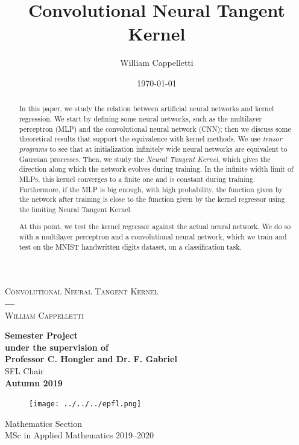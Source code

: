 \documentclass[11pt,notitlepage]{article}
\title{Convolutional Neural Tangent Kernel}
\author{William Cappelletti}
\date{\today}
\numberwithin{equation}{section}
\theoremstyle{remark}
\theoremstyle{definition}
\begin{document}
	\begin{titlepage}
		\centering
		\vspace*{0.cm}
		{\Huge \textsc{Convolutional Neural Tangent Kernel\\}}
		\vspace*{0.3cm}
		\textbf{---}\\
		\vspace*{0.3cm}
		{\Large \textsc{William Cappelletti\\}}
		\vspace*{0.7cm}
		
		\begin{abstract}
			In this paper, we study the relation between artificial neural networks and kernel regression.
			We start by defining some neural networks, such as the multilayer perceptron (MLP) and the convolutional neural network (CNN); then we discuss some theoretical results that support the equivalence with kernel methods.			
			We use \emph{tensor programs} to see that at initialization infinitely wide neural networks are equivalent to Gaussian processes.
			Then, we study the \emph{Neural Tangent Kernel}, which gives the direction along which the network evolves during training.
			In the infinite width limit of MLPs, this kernel converges to a finite one and is constant during training.
			Furthermore, if the MLP is big enough, with high probability, the function given by the network after training is close to the function given by the kernel regressor using the limiting Neural Tangent Kernel.
			
			At this point, we test the kernel regressor against the actual neural network.
			We do so with a multilayer perceptron and a convolutional neural network, which we train and test on the MNIST handwritten digits dataset, on a classification task.
		\end{abstract}
		
		
		\vspace*{1cm}
		{\large \textbf{Semester Project\\
				\vspace*{0.1cm}
				under the supervision of\\
				Professor C. Hongler and Dr. F. Gabriel}\\}
		\vspace*{0.2cm}
		SFL Chair\\
		\vspace*{1cm}
		\textbf{Autumn 2019}\\
		\begin{figure}[h]
			\begin{center}
				\texttt{[image: ../../../epfl.png]}
			\end{center}
		\end{figure}
		Mathematics Section\\
		MSc in Applied Mathematics 2019--2020
		
		
	
	\end{titlepage}
	
\end{document}
